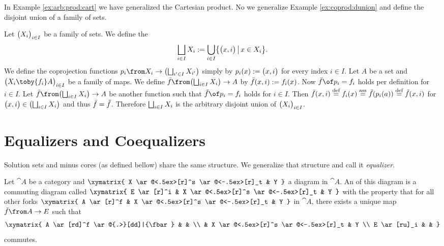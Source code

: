 In Example \ref{ex:arb:prod:cart} we have generalized the Cartesian product.
No we generalize Example \ref{ex:coprod:dunion} and define the disjoint union of a family of sets.

\begin{example}
  \label{ex:arb:coprod:dunion}
  Let $\bigl( X_i \bigr)_{i \in I}$ be a family of sets. We define the 
  $$\bigsqcup_{i \in I}{X_i} := \bigcup_{i \in I} \bigl \{ \bigl( x , i \bigr) \,\big|\, x \in X_i \bigr \}.$$
  We define the coprojection functions $p_i \from X_i \to \bigl(\bigdunion_{i' \in I}{X_{i'}}\bigr)$ simply by $p_i(x) := \bigl( x , i \bigr)$ for every index $i \in I$.
  Let $A$ be a set and $\family{X_i \toby{f_i} A}{i \in I}$ be a family of maps. We define $\fbar \from \bigl(\bigdunion_{i \in I}{X_i}\bigr) \to A$ by $\bar{f}(x, i) := f_i(x)$.
  Now $\fbar \of p_i = f_i$ holds per definition for $i \in I$.
  Let $\ftilde \from \bigl(\bigdunion_{i \in I}{X_i}\bigr) \to A$ be another function such that $\ftilde \of p_i = f_i$ holds for $i \in I$. Then
  $\bar{f}(x, i) \stackrel{\text{def}}{=} f_i(x) \stackrel{\text{ass}}{=} \tilde{f}(p_i(a)) \stackrel{\text{def}}{=} \tilde{f}(x, i)$ for $\bigl( x , i \bigr) \in \bigl(\bigsqcup_{i \in I}{X_i}\bigr)$ and thus $\bar{f} = \tilde{f}$.
  Therefore $\bigsqcup_{i \in I}{X_i}$ is the arbitrary disjoint union of $\bigl( X_i \bigr)_{i \in I}$.
\end{example}

\section*{Equalizers and Coequalizers}

Solution sets and minus cores (as defined bellow) share the same structure.
We generalize that structure and call it \emph{equalizer}.

\begin{definition}[Equalizer]
  \label{def:equa}
  Let $\cat{A}$ be a category and
  $ \xymatrix{
    X \ar@<.5ex>[r]^s \ar@<-.5ex>[r]_t & Y
  } $
  a diagram in $\cat{A}$.
  An  of this diagram is a commuting diagram called 
  $ \xymatrix{
    E \ar[r]^i & X \ar@<.5ex>[r]^s \ar@<-.5ex>[r]_t & Y
  } $
  with the property that for all other forks
  $ \xymatrix{
    A \ar[r]^f & X \ar@<.5ex>[r]^s \ar@<-.5ex>[r]_t & Y
  } $
  in $\cat{A}$, there exists a unique map $\fbar\from A \to E$ such that
  \[ \xymatrix{
    A \ar[rd]^f \ar@{.>}[dd]|{\fbar} & & \\
    & X \ar@<.5ex>[r]^s \ar@<-.5ex>[r]_t & Y \\
    E \ar[ru]_i & &
  } \]
  commutes.
\end{definition}

